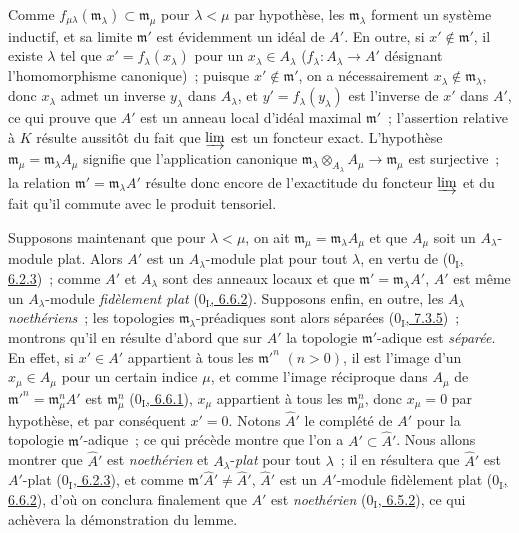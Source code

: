 Comme $f_{\mu\lambda}(\mathfrak m_\lambda)\subset\mathfrak m_\mu$ pour
$\lambda<\mu$ par hypothèse, les $\mathfrak m_\lambda$ forment un système
inductif, et sa limite $\mathfrak m'$ est évidemment un idéal de $A'$. En
outre, si $x'\notin\mathfrak m'$, il existe $\lambda$ tel que
$x'=f_\lambda(x_\lambda)$ pour un $x_\lambda\in A_\lambda$
($f_\lambda:A_\lambda\to A'$ désignant l'homomorphisme canonique)~; puisque
$x'\notin\mathfrak m'$, on a nécessairement
$x_\lambda\notin\mathfrak m_\lambda$, donc $x_\lambda$ admet un inverse
$y_\lambda$ dans $A_\lambda$, et $y'=f_\lambda(y_\lambda)$ est l'inverse de
$x'$ dans $A'$, ce qui prouve que $A'$ est un anneau local d'idéal maximal
$\mathfrak m'$~; l'assertion relative à $K$ résulte aussitôt du fait que
$\varinjlim$ est un foncteur exact. L'hypothèse
$\mathfrak m_\mu=\mathfrak m_\lambda A_\mu$ signifie que l'application
canonique
$\mathfrak m_\lambda\otimes_{A_\lambda}A_\mu\to\mathfrak m_\mu$ est
surjective~; la relation $\mathfrak m'=\mathfrak m_\lambda A'$ résulte donc
encore de l'exactitude du foncteur $\varinjlim$ et du fait qu'il commute avec
le produit tensoriel.

Supposons maintenant que pour $\lambda<\mu$, on ait
$\mathfrak m_\mu=\mathfrak m_\lambda A_\mu$ et que $A_\mu$ soit un
$A_\lambda$-module plat. Alors $A'$ est un $A_\lambda$-module plat pour tout
$\lambda$, en vertu de (\hyperref[0.6.2.3-fr]{$0_{\mathrm I}$, 6.2.3})~;
comme $A'$ et $A_\lambda$ sont des anneaux locaux et que
$\mathfrak m'=\mathfrak m_\lambda A'$, $A'$ est même un
$A_\lambda$-module \emph{fidèlement plat}
(\hyperref[0.6.6.2-fr]{$0_{\mathrm I}$, 6.6.2}). Supposons enfin, en outre,
les $A_\lambda$ \emph{noethériens}~; les topologies
$\mathfrak m_\lambda$-préadiques sont alors séparées
(\hyperref[0.7.3.5-fr]{$0_{\mathrm I}$, 7.3.5})~; montrons qu'il en résulte
d'abord que sur $A'$ la topologie $\mathfrak m'$-adique est \emph{séparée}.
En effet, si $x'\in A'$ appartient à tous les $\mathfrak m'^{n}$ $(n>0)$,
il est l'image d'un $x_\mu\in A_\mu$ pour un certain indice $\mu$, et comme
l'image réciproque dans $A_\mu$ de
$\mathfrak m'^{n}=\mathfrak m_\mu^n A'$ est $\mathfrak m_\mu^n$
(\hyperref[0.6.6.1-fr]{$0_{\mathrm I}$, 6.6.1}), $x_\mu$ appartient à tous
les $\mathfrak m_\mu^n$, donc $x_\mu=0$ par hypothèse, et par conséquent
$x'=0$. Notons $\widehat A'$ le complété de $A'$ pour la topologie
$\mathfrak m'$-adique~; ce qui précède montre que l'on a
$A'\subset\widehat A'$. Nous allons montrer que $\widehat A'$ est
\emph{noethérien} et $A_\lambda$-\emph{plat} pour tout $\lambda$~; il en
résultera que $\widehat A'$ est $A'$-plat
(\hyperref[0.6.2.3-fr]{$0_{\mathrm I}$, 6.2.3}), et comme
$\mathfrak m'\widehat A'\ne\widehat A'$, $\widehat A'$ est un $A'$-module
fidèlement plat (\hyperref[0.6.6.2-fr]{$0_{\mathrm I}$, 6.6.2}), d'où on
conclura finalement que $A'$ est \emph{noethérien}
(\hyperref[0.6.5.2-fr]{$0_{\mathrm I}$, 6.5.2}), ce qui achèvera la
démonstration du lemme.

